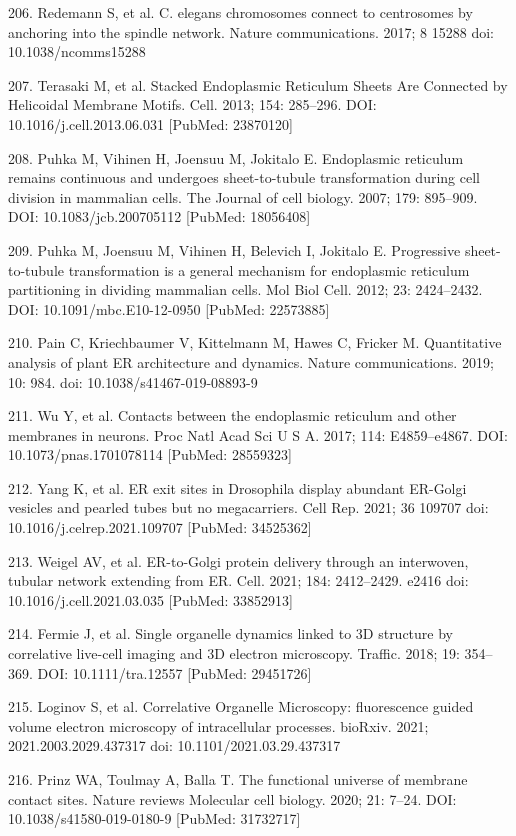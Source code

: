\documentclass{article}
\begin{document}
\begin{hangpars}
206. Redemann S, et al. C. elegans chromosomes connect to centrosomes by anchoring into the spindle network. Nature communications. 2017; 8 15288 doi: 10.1038/ncomms15288

207. Terasaki M, et al. Stacked Endoplasmic Reticulum Sheets Are Connected by Helicoidal Membrane Motifs. Cell. 2013; 154: 285–296. DOI: 10.1016/j.cell.2013.06.031 [PubMed: 23870120]

208. Puhka M, Vihinen H, Joensuu M, Jokitalo E. Endoplasmic reticulum remains continuous and undergoes sheet-to-tubule transformation during cell division in mammalian cells. The Journal of cell biology. 2007; 179: 895–909. DOI: 10.1083/jcb.200705112 [PubMed: 18056408]

209. Puhka M, Joensuu M, Vihinen H, Belevich I, Jokitalo E. Progressive sheet-to-tubule transformation is a general mechanism for endoplasmic reticulum partitioning in dividing mammalian cells. Mol Biol Cell. 2012; 23: 2424–2432. DOI: 10.1091/mbc.E10-12-0950 [PubMed: 22573885]

210. Pain C, Kriechbaumer V, Kittelmann M, Hawes C, Fricker M. Quantitative analysis of plant ER architecture and dynamics. Nature communications. 2019; 10: 984. doi: 10.1038/s41467-019-08893-9

211. Wu Y, et al. Contacts between the endoplasmic reticulum and other membranes in neurons. Proc Natl Acad Sci U S A. 2017; 114: E4859–e4867. DOI: 10.1073/pnas.1701078114 [PubMed: 28559323]

212. Yang K, et al. ER exit sites in Drosophila display abundant ER-Golgi vesicles and pearled tubes but no megacarriers. Cell Rep. 2021; 36 109707 doi: 10.1016/j.celrep.2021.109707 [PubMed: 34525362]

213. Weigel AV, et al. ER-to-Golgi protein delivery through an interwoven, tubular network extending from ER. Cell. 2021; 184: 2412–2429. e2416 doi: 10.1016/j.cell.2021.03.035 [PubMed: 33852913]

214. Fermie J, et al. Single organelle dynamics linked to 3D structure by correlative live-cell imaging and 3D electron microscopy. Traffic. 2018; 19: 354–369. DOI: 10.1111/tra.12557 [PubMed: 29451726]

215. Loginov S, et al. Correlative Organelle Microscopy: fluorescence guided volume electron microscopy of intracellular processes. bioRxiv. 2021; 2021.2003.2029.437317 doi: 10.1101/2021.03.29.437317

216. Prinz WA, Toulmay A, Balla T. The functional universe of membrane contact sites. Nature reviews Molecular cell biology. 2020; 21: 7–24. DOI: 10.1038/s41580-019-0180-9 [PubMed: 31732717]


\end{hangpars}
\end{document}
